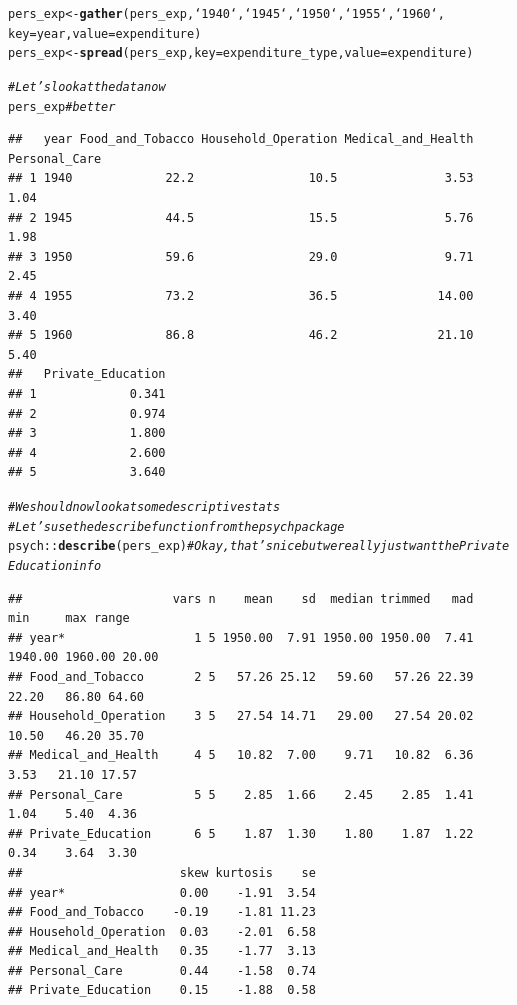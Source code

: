 \documentclass{article}\usepackage[]{graphicx}\usepackage[]{color}
\makeatletter
\newcommand{\hlcom}[1]{\textcolor[rgb]{0.678,0.584,0.686}{\textit{#1}}}%
\newcommand{\hlopt}[1]{\textcolor[rgb]{0,0,0}{#1}}%
\newcommand{\hlstd}[1]{\textcolor[rgb]{0.345,0.345,0.345}{#1}}%
\newcommand{\hlkwb}[1]{\textcolor[rgb]{0.69,0.353,0.396}{#1}}%
\newcommand{\hlkwc}[1]{\textcolor[rgb]{0.333,0.667,0.333}{#1}}%
\newcommand{\hlkwd}[1]{\textcolor[rgb]{0.737,0.353,0.396}{\textbf{#1}}}%
\newenvironment{kframe}{%
 \def\at@end@of@kframe{}%
 \ifinner\ifhmode%
  \def\at@end@of@kframe{\end{minipage}}%
  \begin{minipage}{\columnwidth}%
 \fi\fi%
 \def\FrameCommand##1{\hskip\@totalleftmargin \hskip-\fboxsep
 \colorbox{shadecolor}{##1}\hskip-\fboxsep
     \hskip-\linewidth \hskip-\@totalleftmargin \hskip\columnwidth}%
 \MakeFramed {\advance\hsize-\width
   \@totalleftmargin\z@ \linewidth\hsize
   \@setminipage}}%
 {\par\unskip\endMakeFramed%
 \at@end@of@kframe}
\newenvironment{knitrout}{}{} %
\makeatother
\begin{document}
\begin{knitrout}
\begin{kframe}
\begin{alltt}
\hlstd{pers_exp} \hlkwb{<-} \hlkwd{gather}\hlstd{( pers_exp , `1940` , `1945` , `1950` , `1955` , `1960` ,}
        \hlkwc{key} \hlstd{= year,} \hlkwc{value} \hlstd{=  expenditure)}
\hlstd{pers_exp} \hlkwb{<-} \hlkwd{spread}\hlstd{( pers_exp ,} \hlkwc{key} \hlstd{= expenditure_type ,} \hlkwc{value} \hlstd{= expenditure)}

\hlcom{# Let's look at the data now}
\hlstd{pers_exp}        \hlcom{#better}
\end{alltt}
\begin{verbatim}
##   year Food_and_Tobacco Household_Operation Medical_and_Health Personal_Care
## 1 1940             22.2                10.5               3.53          1.04
## 2 1945             44.5                15.5               5.76          1.98
## 3 1950             59.6                29.0               9.71          2.45
## 4 1955             73.2                36.5              14.00          3.40
## 5 1960             86.8                46.2              21.10          5.40
##   Private_Education
## 1             0.341
## 2             0.974
## 3             1.800
## 4             2.600
## 5             3.640
\end{verbatim}
\begin{alltt}
\hlcom{# We should now look at some descriptive stats}
\hlcom{# Let's use the describe function from the psych package}
\hlstd{psych}\hlopt{::}\hlkwd{describe}\hlstd{(pers_exp)} \hlcom{# Okay, that's nice but we really just want the Private Education info}
\end{alltt}
\begin{verbatim}
##                     vars n    mean    sd  median trimmed   mad     min     max range
## year*                  1 5 1950.00  7.91 1950.00 1950.00  7.41 1940.00 1960.00 20.00
## Food_and_Tobacco       2 5   57.26 25.12   59.60   57.26 22.39   22.20   86.80 64.60
## Household_Operation    3 5   27.54 14.71   29.00   27.54 20.02   10.50   46.20 35.70
## Medical_and_Health     4 5   10.82  7.00    9.71   10.82  6.36    3.53   21.10 17.57
## Personal_Care          5 5    2.85  1.66    2.45    2.85  1.41    1.04    5.40  4.36
## Private_Education      6 5    1.87  1.30    1.80    1.87  1.22    0.34    3.64  3.30
##                      skew kurtosis    se
## year*                0.00    -1.91  3.54
## Food_and_Tobacco    -0.19    -1.81 11.23
## Household_Operation  0.03    -2.01  6.58
## Medical_and_Health   0.35    -1.77  3.13
## Personal_Care        0.44    -1.58  0.74
## Private_Education    0.15    -1.88  0.58
\end{verbatim}

\end{kframe}
\end{knitrout}
\end{document}
